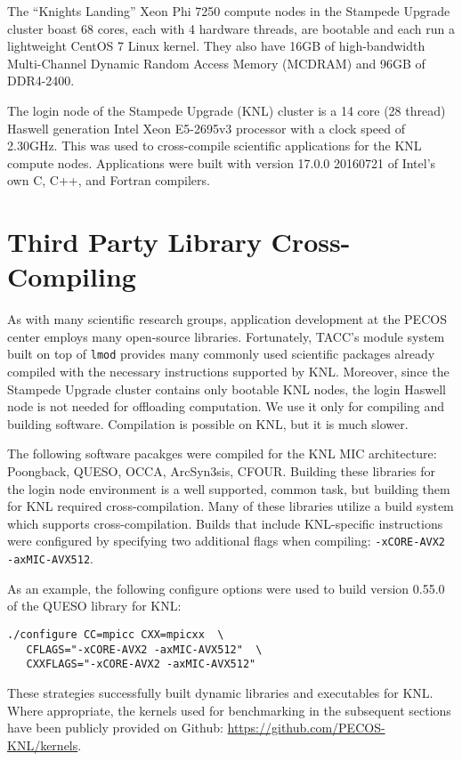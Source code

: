 The ``Knights Landing'' Xeon Phi 7250 compute nodes in the Stampede Upgrade
cluster boast 68 cores, each with 4 hardware threads, are bootable and each run
a lightweight CentOS 7 Linux kernel.  They also have 16GB of high-bandwidth
Multi-Channel Dynamic Random Access Memory (MCDRAM) and 96GB of DDR4-2400.

The login node of the Stampede Upgrade (KNL) cluster is a 14 core (28 thread)
Haswell generation Intel Xeon E5-2695v3 processor with a clock speed of
2.30GHz.  This was used to cross-compile scientific applications for the KNL
compute nodes.  Applications were built with version 17.0.0 20160721 of Intel's
own C, C++, and Fortran compilers.

\section{Third Party Library Cross-Compiling}
\label{sec:cross_compile}

As with many scientific research groups, application development at the PECOS
center employs many open-source libraries.  Fortunately, TACC's module system
built on top of \texttt{lmod} provides many commonly used scientific packages
already compiled with the necessary instructions supported by KNL.  Moreover,
since the Stampede Upgrade cluster contains only bootable KNL nodes, the login
Haswell node is not needed for offloading computation.  We use it only for
compiling and building software.  Compilation is possible on KNL, but it is
much slower.

The following software pacakges were compiled for the KNL MIC architecture:
Poongback, QUESO, OCCA, ArcSyn3sis, CFOUR.  Building these libraries
for the login node environment is a well supported, common task, but building
them for KNL required cross-compilation.  Many of these libraries utilize a
build system which supports cross-compilation.  Builds that include
KNL-specific instructions were configured by specifying two additional flags
when compiling: \texttt{-xCORE-AVX2 -axMIC-AVX512}.

As an example, the following configure options were used to build version
0.55.0 of the QUESO library for KNL:

{\small
\begin{verbatim}
./configure CC=mpicc CXX=mpicxx  \
   CFLAGS="-xCORE-AVX2 -axMIC-AVX512"  \
   CXXFLAGS="-xCORE-AVX2 -axMIC-AVX512"
\end{verbatim}
}

These strategies successfully built dynamic libraries and executables for KNL.
Where appropriate, the kernels used for benchmarking in the subsequent sections have been 
publicly provided on Github: \url{https://github.com/PECOS-KNL/kernels}. 
